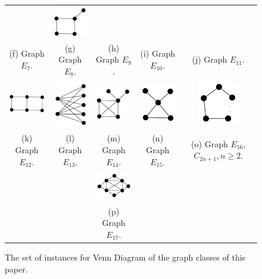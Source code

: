 \documentclass{dmgt}
\begin{document}
\begin{figure}[htb]
\begin{tabular}{  c c c c  c}
    & 
    \includegraphics[width=1.8cm]{e11.png} 
    \\ %
    \footnotesize 
    (f)  \footnotesize Graph $E_7$. 
    & 
    \footnotesize (g) Graph $E_8$.
    & 
    \footnotesize (h) Graph $E_9$.
    & 
    \footnotesize (i) Graph $E_{10}$.
    & 
    \footnotesize (j) Graph $E_{11}$.
    \\%
        \includegraphics[width=2.5cm]{e12.png} 
    & 
    \includegraphics[width=2cm]{k25.png} 
    & 
    \includegraphics[width=2cm]{e14.png} 
    & 
    \includegraphics[width=1.8cm]{e15.png} 
    & 
    \includegraphics[width=1.8cm]{c2n+1.png} 
    \\ %
    \footnotesize 
    (k)  \footnotesize Graph $E_{12}$. 
    & 
    \footnotesize (l) Graph $E_{13}$.
    & 
    \footnotesize (m) Graph  $E_{14}$.
    & 
    \footnotesize (n) Graph $E_{15}$.
    & 
    \footnotesize (o)  Graph $E_{16}$,  $C_{2n+1},n\geq2$.
    \\
    &&\includegraphics[width=2.5cm]{4sunNoLabel.png}&&
    \\
    &&\footnotesize (p)  Graph $E_{17}$.&&
  
  \end{tabular}
 \caption{The set of instances for Venn Diagram of the graph classes of this paper.}
 \label{fig:exemplosDiagram}
\end{figure}  
 
\end{document}
